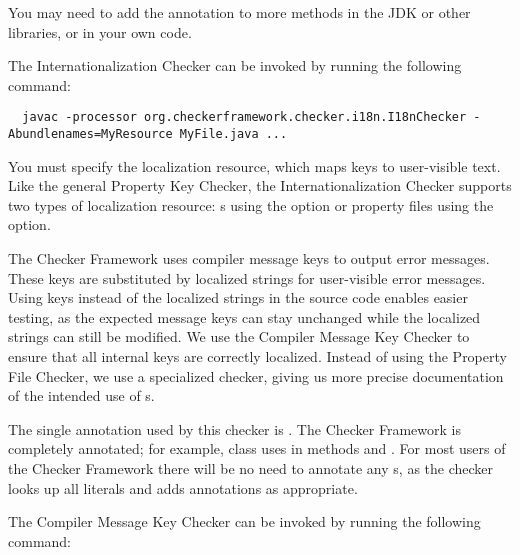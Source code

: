 You may need to add the  annotation to more methods in the
JDK or other libraries, or in your own code.



The Internationalization Checker can be invoked by running the following
command:

\begin{smaller}
\begin{Verbatim}
  javac -processor org.checkerframework.checker.i18n.I18nChecker -Abundlenames=MyResource MyFile.java ...
\end{Verbatim}
\end{smaller}

You must specify the localization resource, which maps keys to user-visible
text.  Like the general Property Key Checker, the Internationalization Checker
supports two types of localization resource:
s using the
 option
or property files using the
 option.




The Checker Framework uses compiler message keys to output error messages.
These keys are substituted by localized strings for user-visible error messages.
Using keys instead of the localized strings in the source code enables easier
testing, as the expected message keys can stay unchanged while the localized
strings can still be modified.
We use the Compiler Message Key Checker to ensure that all internal
keys are correctly localized.
Instead of using the Property File Checker, we use a specialized checker,
giving us more precise documentation of the intended use of s.

The single annotation used by this checker is
.
The Checker Framework is completely annotated;
for example, class 
uses  in methods  and .
For most users of the Checker Framework there will be no need to annotate any
s, as the checker looks up all  literals and adds
annotations as appropriate.

The Compiler Message Key Checker can be invoked by running the following
command:

